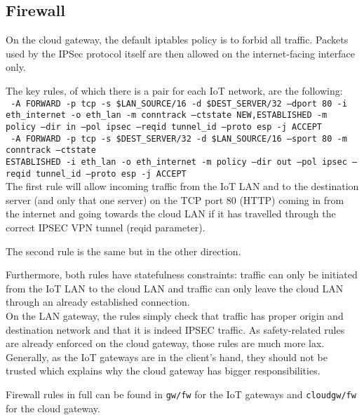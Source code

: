 \documentclass[paper=a4, fontsize=11pt]{scrartcl}
\begin{document}
\subsection{Firewall}\label{firewall}

On the cloud gateway, the default iptables policy is to forbid all traffic.
Packets used by the IPSec protocol itself are then allowed on the
internet-facing interface only.

The key rules, of which there is a pair for each IoT network, are the following:
\\

\texttt{%
    -A FORWARD -p tcp -s \$LAN\_SOURCE/16 -d \$DEST\_SERVER/32 --dport 80 -i
    eth\_internet -o eth\_lan -m conntrack --ctstate NEW,ESTABLISHED -m policy
    --dir in --pol ipsec --reqid tunnel\_id --proto esp -j ACCEPT
}
\\

\texttt{%
    -A FORWARD -p tcp -s \$DEST\_SERVER/32 -d \$LAN\_SOURCE/16 --sport 80 -m
    conntrack --ctstate \\ESTABLISHED -i eth\_lan -o eth\_internet -m policy --dir
    out --pol ipsec --reqid tunnel\_id --proto esp -j ACCEPT
}
\\

The first rule will allow incoming traffic from the IoT LAN and to the
destination server (and only that one server) on the TCP port 80 (HTTP) coming
in from the internet and going towards the cloud LAN if it has travelled
through the correct IPSEC VPN tunnel (reqid parameter).

The second rule is the same but in the other direction.

Furthermore, both rules have statefulness constraints: traffic can only be
initiated from the IoT LAN to the cloud LAN and traffic can only leave the cloud
LAN through an already established connection.
\\

On the LAN gateway, the rules simply check that traffic has proper origin and
destination network and that it is indeed IPSEC traffic.
As safety-related rules are already enforced on the cloud gateway, those rules
are much more lax.
Generally, as the IoT gateways are in the client's hand, they should not be
trusted which explains why the cloud gateway has bigger responsibilities.

Firewall rules in full can be found in \texttt{gw/fw} for the IoT gateways and
\texttt{cloudgw/fw} for the cloud gateway.
\end{document}
